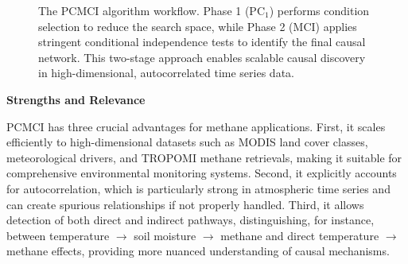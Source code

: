 \begin{figure}[h!]
	\centering
	\caption[The PCMCI algorithm workflow]{The PCMCI algorithm workflow. Phase 1 (PC$_1$) performs condition selection to reduce the search space, while Phase 2 (MCI) applies stringent conditional independence tests to identify the final causal network. This two-stage approach enables scalable causal discovery in high-dimensional, autocorrelated time series data.}
	\label{fig:pcmi_algorithm}
\end{figure}

\textbf{Strengths and Relevance}

PCMCI has three crucial advantages for methane applications. First, it scales efficiently to high-dimensional datasets such as MODIS land cover classes, meteorological drivers, and TROPOMI methane retrievals, making it suitable for comprehensive environmental monitoring systems. Second, it explicitly accounts for autocorrelation, which is particularly strong in atmospheric time series and can create spurious relationships if not properly handled. Third, it allows detection of both direct and indirect pathways, distinguishing, for instance, between temperature $\rightarrow$ soil moisture $\rightarrow$ methane and direct temperature $\rightarrow$ methane effects, providing more nuanced understanding of causal mechanisms.

